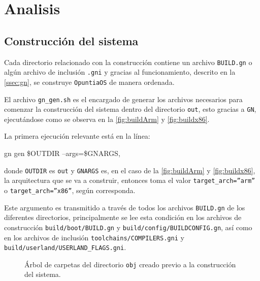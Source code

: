 \section{Analisis}

\begin{comment}
	Los archivos build.ninja los utiliza el ninja como si fuera el Makefile.
	Los archivos BUILD.gn los usa gn [gen] como si fuera el Makefile.
	
\end{comment}


\subsection{Construcción del sistema}
	Cada directorio relacionado con la construcción contiene un archivo \texttt{BUILD.gn} o algún archivo de inclusión \texttt{.gni} y gracias al funcionamiento, descrito en la \autoref{ssec:gn}, se construye \texttt{OpuntiaOS} de manera ordenada.

	
	
	El archivo \texttt{gn\_gen.sh} es el encargado de generar los archivos necesarios para comenzar la construcción del sistema dentro del directorio \texttt{out}, esto gracias a \texttt{GN}, ejecutándose como se observa en la \autoref{fig:buildArm} y \autoref{fig:buildx86}.
	
	
	
	La primera ejecución relevante está en la línea:
	\begin{center}
		\ttfamily
		gn gen \$OUTDIR --args=\$GNARGS,
	\end{center}
	
	donde \texttt{OUTDIR} es \texttt{out} y \texttt{GNARGS} es, en el caso de la \autoref{fig:buildArm} y \autoref{fig:buildx86}, la arquitectura que se va a construir, entonces toma el valor \texttt{target\_arch=''arm''} o \texttt{target\_arch=''x86''}, según corresponda.
	
	
	
	Este argumento es transmitido a través de todos los archivos \texttt{BUILD.gn} de los diferentes directorios, principalmente se lee esta condición en los archivos de construcción \texttt{build/boot/BUILD.gn} y \texttt{build/config/BUILDCONFIG.gn}, así como en los archivos de inclusión \texttt{toolchains/COMPILERS.gni} y \\ \texttt{build/userland/USERLAND\_FLAGS.gni}.
	
	\begin{figure}[ht]
		\centering
		\hspace*{0.3cm}
		\caption{
			Árbol de carpetas del directorio \texttt{obj} creado previo a
			la construcción del sistema.
			\label{fig:outPrebuild}
		}
	\end{figure}

